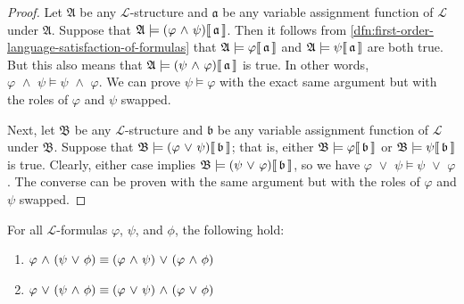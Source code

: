 \begin{proof}
    Let \( \mathfrak{A} \) be any \( \mathcal{L} \)-structure and \( \mathfrak{a} \) be any variable assignment function of \( \mathcal{L} \) under
    \( \mathfrak{A} \). Suppose that \( \folwffsatisfaction{\mathfrak{A}}{\mleft( \varphi \,\,{\land}\,\, \psi \mright)}{\mathfrak{a}} \).
    Then it follows from \cref{dfn:first-order-language-satisfaction-of-formulas} that \(  \mathfrak{A} \models \varphi\llbracket\, \mathfrak{a} \,\rrbracket \)
    and \(  \mathfrak{A} \models \psi\llbracket\, \mathfrak{a} \,\rrbracket \) are both true.
    But this also means that \( \folwffsatisfaction{\mathfrak{A}}{\mleft( \psi \,\,{\land}\,\, \varphi \mright)}{\mathfrak{a}} \) is true.
    In other words, \( \varphi \,\,{\land}\,\, \psi \models \psi \,\,{\land}\,\, \varphi \).
    We can prove \( \psi \models \varphi \) with the exact same argument but with the roles of \( \varphi \) and \( \psi \) swapped.

    \vspace{0.3cm}
    \noindent
    Next, let \( \mathfrak{B} \) be any \( \mathcal{L} \)-structure and \( \mathfrak{b} \) be any variable assignment function of \( \mathcal{L} \) under
    \( \mathfrak{B} \).
    Suppose that \( \folwffsatisfaction{\mathfrak{B}}{\mleft( \varphi \,\,{\lor}\,\, \psi \mright)}{\mathfrak{b}} \); that is, either
    \(  \mathfrak{B} \models \varphi\llbracket\, \mathfrak{b} \,\rrbracket \) or \(  \mathfrak{B} \models \psi\llbracket\, \mathfrak{b} \,\rrbracket \) is true.
    Clearly, either case implies \( \folwffsatisfaction{\mathfrak{B}}{\mleft( \psi \,\,{\lor}\,\, \varphi \mright)}{\mathfrak{b}} \),
    so we have \( \varphi \,\,{\lor}\,\, \psi \models \psi \,\,{\lor}\,\, \varphi \).
    The converse can be proven with the same argument but with the roles of \( \varphi \) and \( \psi \) swapped.
\end{proof}

\begin{thm}[Distributivity]
     \label{logical-equivalence:distributivity-of-conjunctions-and-disjunctions}
    For all \( \mathcal{L} \)-formulas \( \varphi \), \( \psi \), and \( \phi \), the following hold:
    \begin{enumerate}[topsep=2pt,label=\textup{\texttt{(\alph*)}}]
        \item \( \varphi \,\,{\land}\,\, \mleft( \psi \,\,{\lor}\,\, \phi \mright) \equiv \mleft( \varphi \,\,{\land}\,\, \psi \mright) \,\,{\lor}\,\, \mleft( \varphi \,\,{\land}\,\, \phi \mright) \)
        \item \( \varphi \,\,{\lor}\,\, \mleft( \psi \,\,{\land}\,\, \phi \mright) \equiv \mleft( \varphi \,\,{\lor}\,\, \psi \mright) \,\,{\land}\,\, \mleft( \varphi \,\,{\lor}\,\, \phi \mright) \)
    \end{enumerate}
\end{thm}

